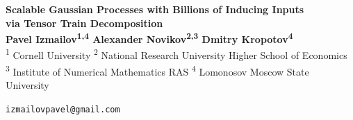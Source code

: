 \documentclass[a0,portrait]{a0poster}
\begin{document}


\begin{minipage}[b]{1.\linewidth}
  \begin{center}
  \veryHuge \color{NavyBlue} 
    \textbf{Scalable Gaussian Processes with Billions of Inducing Inputs \\via Tensor Train Decomposition} \color{Black}\\ %
\huge \textbf{Pavel Izmailov\textsuperscript{1,4} \quad Alexander Novikov\textsuperscript{2,3} \quad Dmitry Kropotov\textsuperscript{4}}\\[0.5cm] %
\huge \textsuperscript{1} Cornell University 
  \quad 
  \textsuperscript{2} National Research University Higher School of Economics\\
  \quad 
  \textsuperscript{3} Institute of Numerical Mathematics RAS
  \quad 
  \textsuperscript{4} Lomonosov Moscow State University
  \\[0.4cm] %
\end{center}
\Large \texttt{izmailovpavel@gmail.com} %
\end{minipage}
%

\vspace{1cm} %
\large

\end{document}
